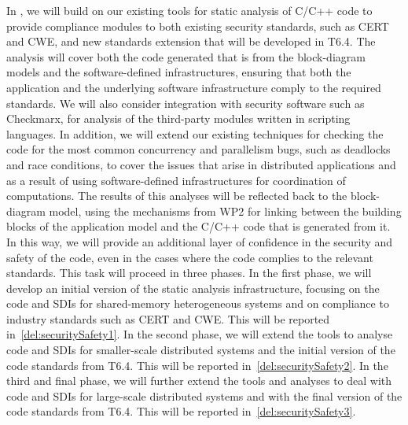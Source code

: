 \begin{Workpackage}{\thewpno}
\begin{Task}
\TaskResults{
\ref{del:securitySafety1}
\ref{del:securitySafety2}
\ref{del:securitySafety3}
}
 \TaskHeader{}
In \theTask, we will build on our existing tools for static analysis of C/C++ code to provide compliance
modules to both existing security standards, such as CERT and CWE, and
new standards extension that will be developed in T6.4.
The analysis will cover both the code generated that is from the block-diagram
models and the software-defined infrastructures, ensuring that both the application and the underlying software
infrastructure comply to the required standards. We will also consider integration with security software such as
Checkmarx, for analysis of the third-party modules written in scripting languages.
In addition, we will extend our existing techniques
for checking the code for the most common concurrency and parallelism bugs, such as deadlocks and race conditions,
to cover the issues that arise in distributed applications and as a result of using software-defined
infrastructures for coordination of computations. The results of this analyses will be reflected back to the
block-diagram model, using the mechanisms from WP2 for linking between the building blocks of the 
application model and the C/C++ code that is generated from it. In this way, we will provide an additional layer of 
confidence in the security and safety of the code, even in the cases where the code complies to the 
relevant standards. This task will proceed in three phases. In the first phase, we will develop an initial 
version of the \TheProject{} static analysis infrastructure, focusing on the code and SDIs for 
shared-memory heterogeneous systems and on compliance to industry standards such as CERT and CWE. 
This will be reported in~\ref{del:securitySafety1}. In the second phase, we will extend the tools 
to analyse code and SDIs for smaller-scale distributed systems and the initial version of the \TheProject{} 
code standards from T6.4. This will be reported in~\ref{del:securitySafety2}. In the third
and final phase, we will further extend the tools and analyses to deal with code and SDIs for large-scale
distributed systems and with the final version of the \TheProject{} code standards from T6.4. This will be
reported in~\ref{del:securitySafety3}.
  

\end{Task}
\end{Workpackage}
